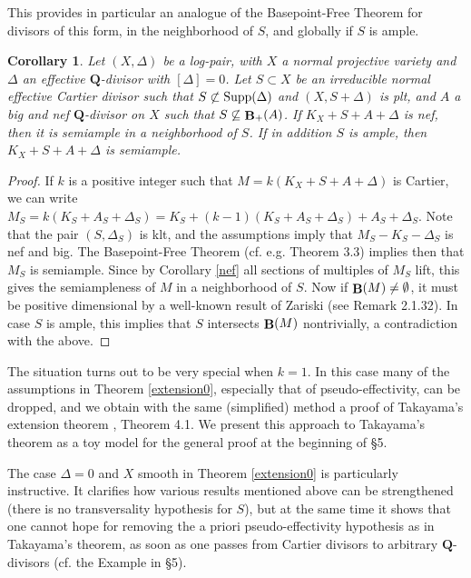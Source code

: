 \documentclass[11pt]{amsart}
\theoremstyle{plain}
\newtheorem{corollaryalpha}[theoremalpha]{Corollary}
\theoremstyle{definition}
\newcommand{\QQ}{\mathbf{Q}}
\DeclareMathOperator{\BB}{{\bf B}}
\begin{document}
This provides in particular an analogue of the Basepoint-Free Theorem for divisors of  this form, in the 
neighborhood of $S$, and globally if $S$ is ample.

\begin{corollaryalpha}
Let $(X, \Delta)$ be a log-pair, with $X$ a normal projective variety and $\Delta$ an effective $\QQ$-divisor with $[\Delta] = 0$. Let $S \subset X$ be an irreducible normal effective Cartier divisor such that $S \not\subset {\rm Supp}(\Delta)$ and 
$(X, S+ \Delta)$ is plt, and $A$ a big and nef $\QQ$-divisor on $X$ such that $S \not\subseteq \BB_{+} (A)$. If $K_X + S + A + \Delta$ is nef, then it is semiample in a neighborhood of $S$. If in addition
$S$ is ample, then $K_X + S + A + \Delta$ is semiample.
\end{corollaryalpha}
\begin{proof}
If $k$ is a positive integer such that $M = k(K_X + S + A + \Delta)$ is Cartier, we can write 
$M_S = k(K_S + A_S + \Delta_S) = K_S + (k-1)(K_S + A_S + \Delta_S) + A_S + \Delta_S$.
Note that the pair $(S, \Delta_S)$ is klt, and the assumptions imply that $M_S - K_S - \Delta_S$ is nef and big. The Basepoint-Free Theorem (cf. e.g. \cite{km} Theorem 3.3) implies then that $M_S$ is semiample. Since by Corollary \ref{nef} all sections of multiples of $M_S$ lift, this gives the semiampleness of $M$ in a neighborhood of $S$. Now if $\BB( M) \neq \emptyset$, it must be 
positive dimensional by a well-known result of Zariski (see \cite{positivity} Remark 2.1.32).  
In case $S$ is ample, this implies that 
$S$ intersects $\BB(M)$ nontrivially,  a contradiction with the above.
\end{proof}


The situation turns out to be very special when $k=1$. In this case many of the assumptions in Theorem \ref{extension0}, especially that of pseudo-effectivity, can be dropped, and 
we obtain with the same (simplified) method a proof of Takayama's extension theorem \cite{takayama}, Theorem 4.1. We present this approach to Takayama's theorem as a toy model for the general proof at the beginning of \S5. 

The case $\Delta = 0$  and $X$ smooth in Theorem \ref{extension0} is particularly instructive. It clarifies how various results mentioned above can be strengthened (there is no transversality hypothesis for $S$), 
but at the same time it shows that one cannot hope for removing the a priori pseudo-effectivity hypothesis as in Takayama's theorem, as soon as one passes from Cartier divisors to arbitrary $\QQ$-divisors (cf. the Example in \S5).
\end{document}
